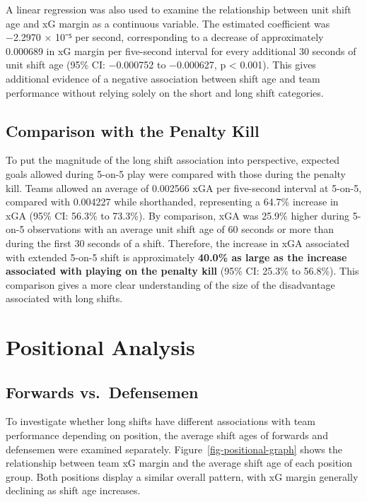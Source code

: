 \documentclass[
  12pt]{article}
\begin{document}
A linear regression was also used to examine the relationship between
unit shift age and xG margin as a continuous variable. The estimated
coefficient was −2.2970 × 10⁻⁵ per second, corresponding to a decrease
of approximately 0.000689 in xG margin per five-second interval for
every additional 30 seconds of unit shift age (95\% CI: −0.000752 to
−0.000627, p \textless{} 0.001). This gives additional evidence of a
negative association between shift age and team performance without
relying solely on the short and long shift categories.

\subsection{Comparison with the Penalty
Kill}\label{comparison-with-the-penalty-kill}

To put the magnitude of the long shift association into perspective,
expected goals allowed during 5-on-5 play were compared with those
during the penalty kill. Teams allowed an average of 0.002566 xGA per
five-second interval at 5-on-5, compared with 0.004227 while
shorthanded, representing a 64.7\% increase in xGA (95\% CI: 56.3\% to
73.3\%). By comparison, xGA was 25.9\% higher during 5-on-5 observations
with an average unit shift age of 60 seconds or more than during the
first 30 seconds of a shift. Therefore, the increase in xGA associated
with extended 5-on-5 shift is approximately \textbf{40.0\% as large as
the increase associated with playing on the penalty kill} (95\% CI:
25.3\% to 56.8\%). This comparison gives a more clear understanding of
the size of the disadvantage associated with long shifts.

\section{Positional Analysis}\label{positional-analysis}

\subsection{Forwards vs.~Defensemen}\label{forwards-vs.-defensemen}

To investigate whether long shifts have different associations with team
performance depending on position, the average shift ages of forwards
and defensemen were examined separately.
Figure~\ref{fig-positional-graph} shows the relationship between team xG
margin and the average shift age of each position group. Both positions
display a similar overall pattern, with xG margin generally declining as
shift age increases.
\end{document}
